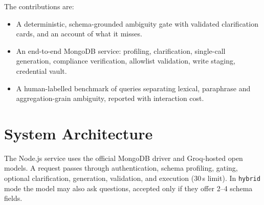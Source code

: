 The contributions are:
\begin{itemize}
\item A deterministic, schema-grounded ambiguity gate with validated clarification cards, and an account of what it misses.
\item An end-to-end MongoDB service: profiling, clarification, single-call generation, compliance verification, allowlist validation, write staging, credential vault.
\item A human-labelled benchmark of \numTotalQueries{} queries separating lexical, paraphrase and aggregation-grain ambiguity, reported with interaction cost.
\end{itemize}

\section{System Architecture}
\label{sec:arch}

The Node.js service uses the official MongoDB driver and Groq-hosted open models. A request passes through authentication, schema profiling, gating, optional clarification, generation, validation, and execution (30\,s limit). In \texttt{hybrid} mode the model may also ask questions, accepted only if they offer 2--4 schema fields.

